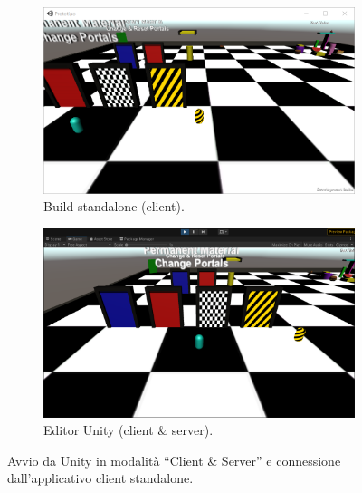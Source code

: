\begin{figure}[!ht]
    \begin{subfigure}{.49\textwidth}
      \centering
      \includegraphics[width=.95\linewidth]{gfx/imgs/chapter4/BuildStandalonePrototipo.png}
      \caption{Build standalone (client).}
      \label{fig:build-standalone}
    \end{subfigure}
    \begin{subfigure}{.49\textwidth}
      \centering
      \includegraphics[width=.95\linewidth]{gfx/imgs/chapter4/BuildStandaloneEditor.png}
      \caption{Editor Unity (client \& server).}
      \label{fig:build-editor}
    \end{subfigure}
    \caption{Avvio da Unity in modalità ``Client \& Server'' e connessione dall'applicativo client standalone.}
    \label{fig:build}
\end{figure}
